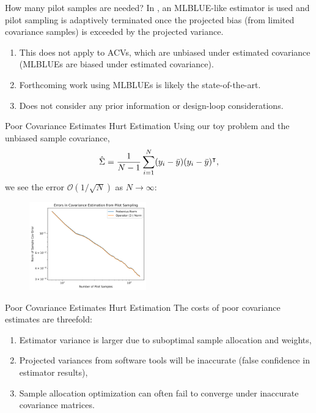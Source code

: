 \documentclass[usenames,dvipsnames]{beamer}
\theoremstyle{definition}
\let\oldcite=\cite
\renewcommand{\cite}[2][]{\textcolor{green}{\oldcite[#1]{#2}}}
\begin{document}
\begin{frame}{How many pilot samples are needed?}
    In \cite{xu_bandit-learning_2022}, an MLBLUE-like estimator is used and pilot sampling is adaptively terminated once the projected bias (from limited covariance samples) is exceeded by the projected variance. 
    \begin{enumerate}
        \item This does not apply to ACVs, which are unbiased under estimated covariance (MLBLUEs are biased under estimated covariance).
        \item Forthcoming work using MLBLUEs is likely the state-of-the-art.
        \item Does not consider any prior information or design-loop considerations.
    \end{enumerate}
\end{frame}

\begin{frame}{Poor Covariance Estimates Hurt Estimation}
    Using our toy problem and the unbiased sample covariance,
    \begin{equation}
        \hat{\Sigma} = \frac{1}{N-1}\sum_{i=1}^{N}(y_{i}-\Bar{y})(y_{i}-\Bar{y})^{\intercal},
    \end{equation}
    we see the error $\mathcal{O}(1/\sqrt{N})$ as $N\rightarrow \infty$:
    \begin{figure}
        \centering
        \includegraphics[width=0.45\textwidth]{fig/Cov_errs.png}
        \label{fig:cov_errs}
    \end{figure}
\end{frame}

\begin{frame}{Poor Covariance Estimates Hurt Estimation}
    The costs of poor covariance estimates are threefold:
    \begin{enumerate}
        \item Estimator variance is larger due to suboptimal sample allocation and weights,
        \item Projected variances from software tools will be inaccurate (false confidence in estimator results),
        \item Sample allocation optimization can often fail to converge under inaccurate covariance matrices.
    \end{enumerate}
\end{frame}
\end{document}
